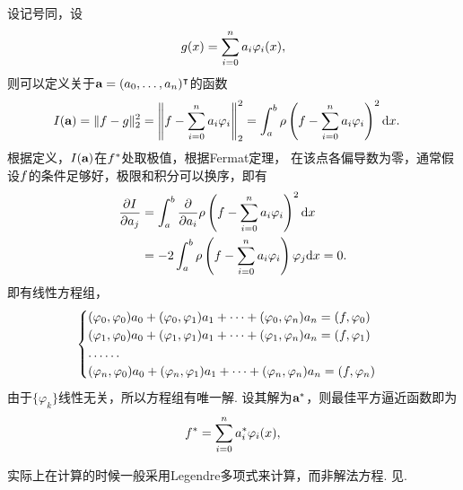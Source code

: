   \begin{thm}[最佳平方逼近的求解]
    设记号同，设
    \[
      \mathnormal{g}(x) = \sum_{i=0}^na_i\varphi_i(x),
    \]
    则可以定义关于$\textbf{a} = (a_0,\dots,a_n)^\intercal$的函数
    \[\begin{split}
      I(\textbf{a}) = \|\mathnormal{f}-\mathnormal{g}\|_2^2 &=
      \left\|\mathnormal{f} - \sum_{i=0}^na_i\varphi_i\right\|_2^2
      =  \int_a^b \rho\left( \mathnormal{f}-\sum_{i=0}^n a_i\varphi_i \right)^2 \mathrm{d} x.
    \end{split}\]
    根据定义，$I(\textbf{a})$在$\mathnormal{f}^*$处取极值，根据Fermat定理，
    在该点各偏导数为零，通常假设$\mathnormal{f}$的条件足够好，极限和积分可以换序，即有
    \[\begin{split}
      \frac{\partial I}{\partial a_j} &=
      \int_a^b \frac{\partial}{\partial a_i}
      \rho\left( \mathnormal{f}-\sum_{i=0}^n a_i\varphi_i \right)^2 \mathrm{d} x\\
      &= -2\int_a^b\rho\left( \mathnormal{f}-\sum_{i=0}^n a_i\varphi_i \right)\varphi_j \mathrm{d} x
      = 0.
    \end{split}\]
    即有线性方程组，
    \begin{equation}\begin{cases}
      \label{equ: 法方程}
      (\varphi_0, \varphi_0)a_0 + (\varphi_0, \varphi_1)a_1 + \cdots + (\varphi_0, \varphi_n)a_n = (\mathnormal{f}, \varphi_0) \\
      (\varphi_1, \varphi_0)a_0 + (\varphi_1, \varphi_1)a_1 + \cdots + (\varphi_1, \varphi_n)a_n = (\mathnormal{f}, \varphi_1) \\
      \dots\dots\\
      (\varphi_n, \varphi_0)a_0 + (\varphi_n, \varphi_1)a_1 + \cdots + (\varphi_n, \varphi_n)a_n = (\mathnormal{f}, \varphi_n)
    \end{cases}\end{equation}
    由于$\{\varphi_k\}$线性无关，所以方程组有唯一解.
    设其解为$\textbf{a}^*$，则最佳平方逼近函数即为
    \[
      \mathnormal{f}^* = \sum_{i=0}^na^*_i\varphi_i(x),
    \]
  \end{thm}
  \remark
    实际上在计算的时候一般采用Legendre多项式来计算，而非解法方程.
    见.

